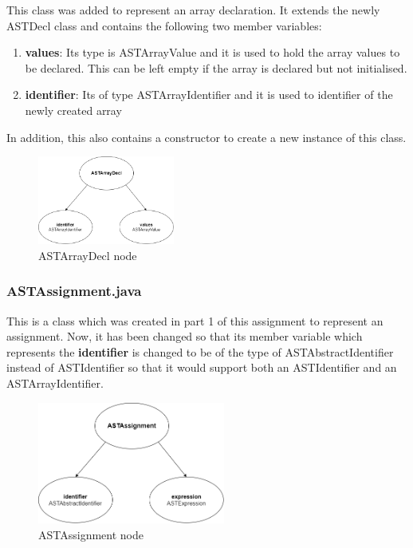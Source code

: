 \documentclass{article}
\begin{document}
					This class was added to represent an array declaration. It extends the newly ASTDecl class and contains the following two member variables:
					
					\begin{enumerate}
					\item \textbf{values}: Its type is ASTArrayValue and it is used to hold the array values to be declared. This can be left empty if the array is declared but not initialised.
					\item \textbf{identifier}: Its of type ASTArrayIdentifier and it is used to identifier of the newly created array
				
					\end{enumerate}
			In addition, this also contains a constructor to create a new instance of this class.
			
							\begin{figure}[H]
					\centering
			 			\includegraphics[width=0.4\textwidth]{arraydecl.png}
			  			\caption{ASTArrayDecl node}
			  			\label{fig:astarraydecl}
					\end{figure}
					
					
					\subsubsection{ASTAssignment.java}
					
					This is a class which was created in part 1 of this assignment to represent an assignment. Now, it has been changed so that its member variable which represents the \textbf{identifier} is changed to be of the type of ASTAbstractIdentifier instead of ASTIdentifier so that it would support both an ASTIdentifier and an ASTArrayIdentifier.
					
					\begin{figure}[H]
					\centering
			 			\includegraphics[width=0.55\textwidth]{astassignment2.png}
			  			\caption{ASTAssignment node}
			  			\label{fig:astassignment}
					\end{figure}
					
\end{document}
